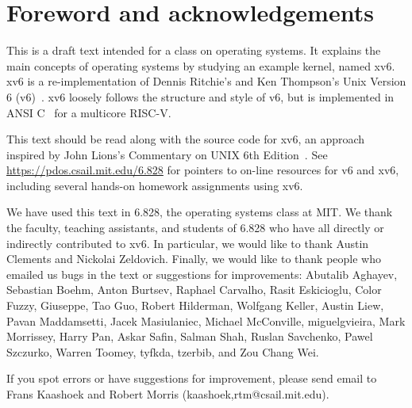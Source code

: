 \chapter*{Foreword and acknowledgements}


This is a draft text intended for a class on operating systems. It
explains the main concepts of operating systems by studying an example
kernel, named xv6.  xv6 is a re-implementation of Dennis Ritchie's and
Ken Thompson's Unix Version 6 (v6)~\cite{unix}.  xv6 loosely follows the structure
and style of v6, but is implemented in ANSI C~\cite{kernighan} for 
a multicore RISC-V.

This text should be read along with the source code for xv6, an approach 
inspired by John Lions's Commentary on UNIX 6th Edition~\cite{lions}. See
\url{https://pdos.csail.mit.edu/6.828} for pointers to on-line
resources for v6 and xv6, including several hands-on homework assignments
using xv6.

We have used this text in 6.828, the operating systems class at MIT.
We thank the faculty, teaching assistants, and students of 6.828 who
have all directly or indirectly contributed to xv6.  In particular, we
would like to thank Austin Clements and Nickolai Zeldovich.  Finally,
we would like to thank people who emailed us bugs in the text or
suggestions for improvements: Abutalib Aghayev, Sebastian Boehm, Anton
Burtsev, Raphael Carvalho, Rasit Eskicioglu, Color Fuzzy, Giuseppe,
Tao Guo, Robert Hilderman, Wolfgang Keller, Austin Liew, Pavan
Maddamsetti, Jacek Masiulaniec, Michael McConville, miguelgvieira,
Mark Morrissey, Harry Pan, Askar Safin, Salman Shah, Ruslan Savchenko,
Pawel Szczurko, Warren Toomey, tyfkda, tzerbib, and Zou Chang Wei.

If you spot errors or have suggestions for improvement, please send email to
Frans Kaashoek and Robert Morris (kaashoek,rtm@csail.mit.edu).
